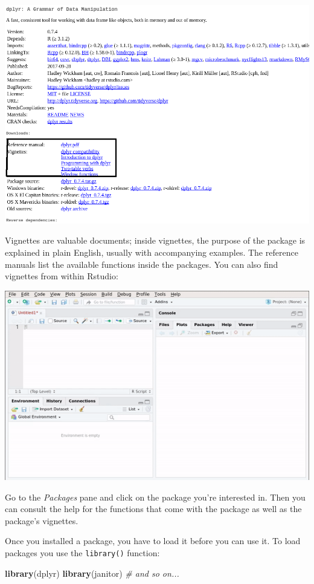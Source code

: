 \documentclass[]{gitbook}
\newenvironment{Shaded}{\begin{snugshade}}{\end{snugshade}}
\newcommand{\CommentTok}[1]{\textcolor[rgb]{0.56,0.35,0.01}{\textit{#1}}}
\newcommand{\KeywordTok}[1]{\textcolor[rgb]{0.13,0.29,0.53}{\textbf{#1}}}
\newcommand{\NormalTok}[1]{#1}
\begin{document}
\includegraphics[width=13.49in]{pics/packages_vignette}

Vignettes are valuable documents; inside vignettes, the purpose of the package is explained in
plain English, usually with accompanying examples. The reference manuals list the available functions
inside the packages. You can also find vignettes from within Rstudio:

\includegraphics{pics/rstudio_vignette.gif}

Go to the \emph{Packages} pane and click on the package you're interested in. Then you can consult the
help for the functions that come with the package as well as the package's vignettes.

Once you installed a package, you have to load it before you can use it. To load packages you use the
\texttt{library()} function:

\begin{Shaded}
\begin{Highlighting}[]
\KeywordTok{library}\NormalTok{(dplyr)}
\KeywordTok{library}\NormalTok{(janitor)}
\CommentTok{# and so on...}
\end{Highlighting}
\end{Shaded}
\end{document}
